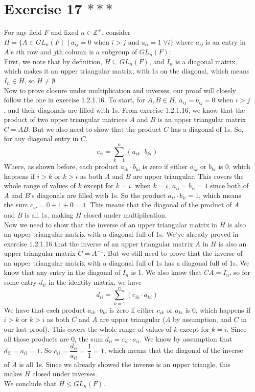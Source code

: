 \documentclass{article}
\newcommand{\Z}{\mathbb{Z}}
\begin{document}
    \section*{Exercise 17 $***$}
    For any field $F$ and fixed $n \in \Z^+$,
    consider $H = \{ A \in GL_n(F) \mid a_{ij} = 0 \text{ when } i > j
    \text{ and } a_{ii} = 1 \; \forall i \}$
    where $a_{ij}$ is an entry in $A$'s $i$th row and $j$th column
    is a subgroup of $GL_n(F)$: \\
    First, we note that by definition, $H \subseteq GL_n(F)$,
    and $I_n$ is a diagonal matrix,
    which makes it an upper triangular matrix,
    with 1s on the diagonal,
    which means $I_n \in H$,
    so $H \neq \emptyset$. \\ 
    Now to prove closure under multiplication and inverses,
    our proof will closely follow the one in exercise 1.2.1.16.
    To start, for $A, B \in H$, $a_{ij} = b_{ij} = 0$ when $i > j$,
    and their diagonals are filled with 1s.
    From exercise 1.2.1.16, we know that the product
    of two upper triangular matrices $A$ and $B$ is an upper triangular
    matrix $C = AB$.
    But we also need to show that the product $C$ has a diagonal of 1s.
    So, for any diagonal entry in $C$,
    \[ c_{ii} = \sum_{k = 1}^n (a_{ik} \cdot b_{ki}) \]
    Where, as shown before,
    each product $a_{ik} \cdot b_{ki}$ is zero 
    if either $a_{ik}$ or $b_{ki}$ is 0,
    which happens if $i > k$ or $k > i$
    as both $A$ and $B$ are upper triangular.
    This covers the whole range of values of $k$
    except for $k = i$.
    when $k = i$, $a_{ii} = b_{ii} = 1$
    since both of $A$ and $B$'s diagonals are filled with 1s.
    So the product $a_{ii} \cdot b_{ii} = 1$,
    which means the sum $c_{ij} = 0 + 1 + 0 = 1$.
    This means that the diagonal of the product of $A$ and $B$ is all 1s, 
    making $H$ closed under multiplication. \\ 
    Now we need to show that the inverse of an upper triangular
    matrix in $H$ is also an upper triangular
    matrix with a diagonal full of 1s.
    We've already proved in exercise 1.2.1.16 that 
    the inverse of an upper triangular matrix $A$ in $H$
    is also an upper triangular matrix $C = A^{-1}$. 
    But we still need to prove that the inverse of an upper triangular
    matrix with a diagonal full of 1s has a diagonal full of 1s.
    We know that any entry in the diagonal of $I_n$ is 1.
    We also know that $CA = I_n$,
    so for some entry $d_{ii}$ in the identity matrix, we have
    \[ d_{ii} = \sum_{k = 1}^n (c_{ik} \cdot a_{ki}) \]
    We have that each product $a_{ik} \cdot b_{ki}$ is zero 
    if either $c_{ik}$ or $a_{ki}$ is 0,
    which happens if $i > k$ or $k > i$
    as both $C$ and $A$ are upper triangular
    ($A$ by assumption, and $C$ in our last proof).
    This covers the whole range of values of $k$
    except for $k = i$.
    Since all those products are 0,
    the sum $d_{ii} = c_{ii} \cdot a_{ii}$.
    We know by assumption that $d_{ii} = a_{ii} = 1$.
    So $c_{ii} = \dfrac{d_{ii}}{a_{ii}} = \dfrac{1}{1} = 1$,
    which means that the diagonal of the inverse of $A$ is all 1s.
    Since we already showed the inverse is an upper triangle,
    this makes $H$ closed under inverses. \\
    We conclude that $H \leqslant GL_n(F)$.
\end{document}
